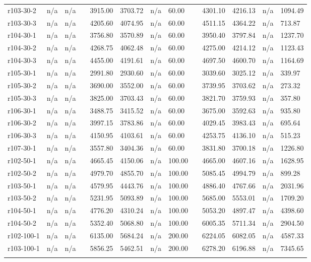 \documentclass[final,5p,times,twocolumn]{elsarticle}
\begin{document}
{{{{{{{{{{{{{\begin{longtable}{l l l l l l l l l l l l l}
r103-30-2& n/a& n/a&&3915.00& 3703.72& n/a& 60.00&&4301.10& 4216.13& n/a& 1094.49\\
r103-30-3& n/a& n/a&&4205.60& 4074.95& n/a& 60.00&&4511.15& 4364.22& n/a& 713.87\\
r104-30-1& n/a& n/a&&3756.80& 3570.89& n/a& 60.00&&3950.40& 3797.84& n/a& 1237.70\\
r104-30-2& n/a& n/a&&4268.75& 4062.48& n/a& 60.00&&4275.00& 4214.12& n/a& 1123.43\\
r104-30-3& n/a& n/a&&4455.00& 4191.61& n/a& 60.00&&4697.50& 4600.70& n/a& 1164.69\\
r105-30-1& n/a& n/a&&2991.80& 2930.60& n/a& 60.00&&3039.60& 3025.12& n/a& 339.97\\
r105-30-2& n/a& n/a&&3690.00& 3552.00& n/a& 60.00&&3739.95& 3703.62& n/a& 273.32\\
r105-30-3& n/a& n/a&&3825.00& 3703.43& n/a& 60.00&&3821.70& 3759.93& n/a& 357.80\\
r106-30-1& n/a& n/a&&3488.75& 3415.52& n/a& 60.00&&3675.00& 3592.63& n/a& 935.80\\
r106-30-2& n/a& n/a&&3997.15& 3783.86& n/a& 60.00&&4029.45& 3983.43& n/a& 695.64\\
r106-30-3& n/a& n/a&&4150.95& 4103.61& n/a& 60.00&&4253.75& 4136.10& n/a& 515.23\\
r107-30-1& n/a& n/a&&3557.80& 3404.36& n/a& 60.00&&3831.80& 3700.18& n/a& 1226.80\\
r102-50-1& n/a& n/a&&4665.45& 4150.06& n/a& 100.00&&4665.00& 4607.16& n/a& 1628.95\\
r102-50-2& n/a& n/a&&4979.70& 4855.70& n/a& 100.00&&5085.45& 4994.79& n/a& 899.28\\
r103-50-1& n/a& n/a&&4579.95& 4443.76& n/a& 100.00&&4886.40& 4767.66& n/a& 2031.96\\
r103-50-2& n/a& n/a&&5231.95& 5093.89& n/a& 100.00&&5685.00& 5553.01& n/a& 1709.20\\
r104-50-1& n/a& n/a&&4776.20& 4310.24& n/a& 100.00&&5053.20& 4897.47& n/a& 4398.60\\
r104-50-2& n/a& n/a&&5352.40& 5068.80& n/a& 100.00&&6005.35& 5711.34& n/a& 2904.50\\
r102-100-1& n/a& n/a&&6135.00& 5684.24& n/a& 200.00&&6224.05& 6082.05& n/a& 4587.33\\
r103-100-1& n/a& n/a&&5856.25& 5462.51& n/a& 200.00&&6278.20& 6196.88& n/a& 7345.65\\
\hline
\label{tab:bm_A2}
\end{longtable}

}}}}}}}}}}}}}
\end{document}
